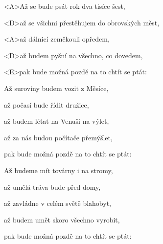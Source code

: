 

\zs
<A>Až se bude psát rok dva tisíce šest,

<D>až se všichni přestěhujem do obrovských měst,

<A>až dálnicí zeměkouli opředem,

<D>až budem pyšní na všechno, co dovedem,

<E>pak bude možná pozdě na to chtít se ptát:

\ks

\zs
Až suroviny budem vozit z Měsíce,

až počasí bude řídit družice,

až budem létat na Venuši na výlet,

až za nás budou počítače přemýšlet,

pak bude možná pozdě na to chtít se ptát:

\ks

\zs
Až budeme mít továrny i na stromy,

až umělá tráva bude před domy,

až zavládne v celém světě blahobyt,

až budem umět skoro všechno vyrobit,

pak bude možná pozdě na to chtít se ptát:

\ks

\kp
